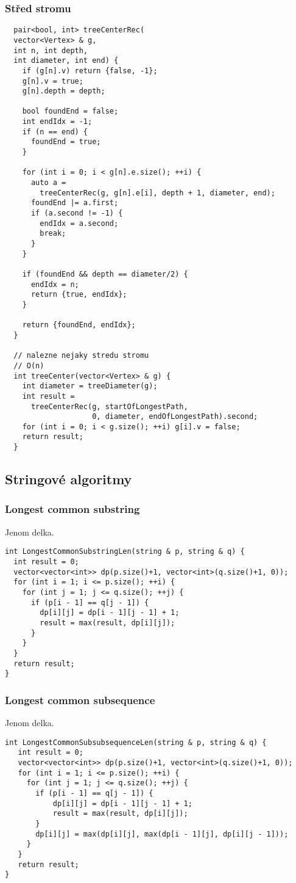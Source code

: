\documentclass{article}
\begin{document}
\subsubsection{Střed stromu}
\begin{lstlisting}
  pair<bool, int> treeCenterRec(
  vector<Vertex> & g,
  int n, int depth,
  int diameter, int end) {
    if (g[n].v) return {false, -1};
    g[n].v = true;
    g[n].depth = depth;

    bool foundEnd = false;
    int endIdx = -1;
    if (n == end) {
      foundEnd = true;
    }

    for (int i = 0; i < g[n].e.size(); ++i) {
      auto a = 
        treeCenterRec(g, g[n].e[i], depth + 1, diameter, end);
      foundEnd |= a.first;
      if (a.second != -1) {
        endIdx = a.second;
        break;
      }
    }

    if (foundEnd && depth == diameter/2) {
      endIdx = n;
      return {true, endIdx};
    }

    return {foundEnd, endIdx};
  }

  // nalezne nejaky stredu stromu
  // O(n)
  int treeCenter(vector<Vertex> & g) {
    int diameter = treeDiameter(g);
    int result = 
      treeCenterRec(g, startOfLongestPath,
                    0, diameter, endOfLongestPath).second;
    for (int i = 0; i < g.size(); ++i) g[i].v = false;
    return result;
  }
\end{lstlisting}


\subsection{Stringové algoritmy}
\subsubsection{Longest common substring}
Jenom delka.
\begin{lstlisting}
int LongestCommonSubstringLen(string & p, string & q) {
  int result = 0;
  vector<vector<int>> dp(p.size()+1, vector<int>(q.size()+1, 0));
  for (int i = 1; i <= p.size(); ++i) {
    for (int j = 1; j <= q.size(); ++j) {
      if (p[i - 1] == q[j - 1]) {
        dp[i][j] = dp[i - 1][j - 1] + 1;
        result = max(result, dp[i][j]);
      }
    }
  }
  return result;
}
\end{lstlisting}

\subsubsection{Longest common subsequence}
Jenom delka.
\begin{lstlisting}
int LongestCommonSubsubsequenceLen(string & p, string & q) {
   int result = 0;
   vector<vector<int>> dp(p.size()+1, vector<int>(q.size()+1, 0));
   for (int i = 1; i <= p.size(); ++i) {
     for (int j = 1; j <= q.size(); ++j) {
       if (p[i - 1] == q[j - 1]) {
           dp[i][j] = dp[i - 1][j - 1] + 1;
           result = max(result, dp[i][j]);
       }
       dp[i][j] = max(dp[i][j], max(dp[i - 1][j], dp[i][j - 1]));
     }
   }
   return result;
}
\end{lstlisting}
\end{document}
